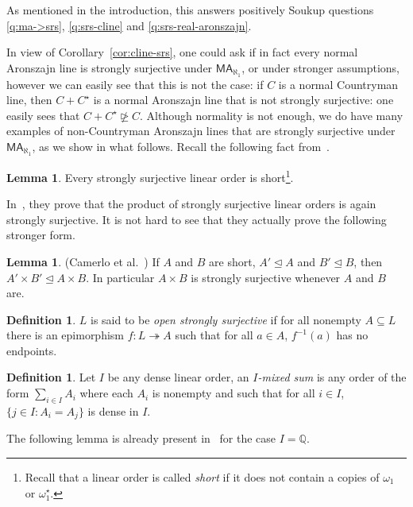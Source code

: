 \documentclass[10pt]{amsart}
\theoremstyle{definition}
\newtheorem{definition}[theorem]{Definition}
\newtheorem{lemma}[theorem]{Lemma}
\theoremstyle{remark}
\newcommand{\seb}{\subseteq}
\newcommand{\axiom}[1]{\mathsf{#1}}
\newcommand{\MA}{\axiom{MA}}
\newcommand{\sleq}{\trianglelefteq}
\newcommand{\nsgeq}{\ntrianglerighteq}
\newcommand{\sur}{\twoheadrightarrow}
\newcommand{\1}{\mathbbm{1}}
\begin{document}
As mentioned in the introduction, this answers positively
Soukup questions \ref{q:ma->srs}, \ref{q:srs-cline} and
\ref{q:srs-real-aronszajn}.

In view of Corollary~\ref{cor:cline-srs}, one could ask if in fact every normal
Aronszajn line is strongly surjective under $\MA_{\aleph_{1}}$, or
under stronger assumptions, however we can easily see that this is not
the case: if $C$ is a normal Countryman line, then $C + C^{\star}$ is
a normal Aronszajn line that is not strongly surjective: one
easily sees that $C + C^{\star} \nsgeq C$. Although
normality is not enough, we do have many examples of non-Countryman
Aronszajn lines that are strongly surjective under $\MA_{\aleph_{1}}$,
as we show in what follows. Recall the following
fact from~\cite{CamerloEtAl2019}.

\begin{lemma}
  Every strongly surjective linear order is short\footnote{Recall that
    a linear order is called \emph{short} if it does not contain a copies
    of $\omega_{1}$ or $\omega_{1}^{\star}$.}.
\end{lemma}

In~\cite[Corollary~2.14]{CamerloEtAl2019}, they prove that the
product of strongly surjective linear orders is again strongly surjective.
It is not hard to see that they actually prove the following stronger form.

\begin{lemma}\label{lem:sur-both-sides} (Camerlo et al.~\cite{CamerloEtAl2019})
  If $A$ and $B$ are short,
  $A' \sleq A$ and $B' \sleq B$,
  then $A' \times B' \sleq A \times B$. In particular
  $A \times B$ is strongly surjective whenever $A$ and $B$ are.
\end{lemma}

\begin{definition}
  $L$ is said to be \emph{open strongly surjective} if for all
  nonempty $A \seb L$ there is an epimorphism $f : L \sur A$ such that
  for all $a \in A$, $f^{-1}(a)$ has no endpoints.
\end{definition}

\begin{definition}
  Let $I$ be any dense linear order, an \emph{$I$-mixed sum} is any
  order of the form $\sum_{i \in I}A_{i}$ where each $A_{i}$ is nonempty
  and such that for all $i \in I$, $\{j \in I : A_{i} = A_{j}\}$ is
  dense in $I$.
\end{definition}

The following lemma is already present in~\cite{Soukup} for the
case $I = \mathbb{Q}$.
\end{document}
